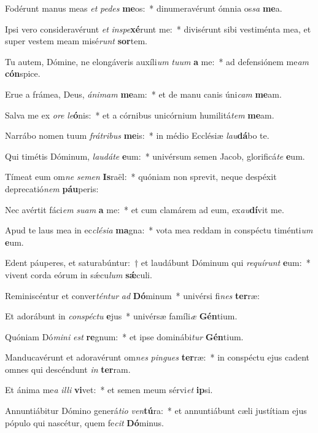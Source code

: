 \item Fodérunt manus meas \textit{et} \textit{pe}\textit{des} \textbf{me}os:~* dinumeravérunt ómnia os\textit{sa} \textbf{me}a.
\item Ipsi vero consideravérunt \textit{et} \textit{in}\textit{spe}\textbf{xé}runt me:~* divisérunt sibi vestiménta mea, et super vestem meam misé\textit{runt} \textbf{sor}tem.
\item Tu autem, Dómine, ne elongáveris auxíli\textit{um} \textit{tu}\textit{um} \textbf{a} me:~* ad defensiónem me\textit{am} \textbf{cón}spice.
\item Erue a frámea, Deus, \textit{á}\textit{ni}\textit{mam} \textbf{me}am:~* et de manu canis úni\textit{cam} \textbf{me}am.
\item Salva me ex \textit{o}\textit{re} \textit{le}\textbf{ó}nis:~* et a córnibus unicórnium humilitá\textit{tem} \textbf{me}am.
\item Narrábo nomen tuum \textit{frá}\textit{tri}\textit{bus} \textbf{me}is:~* in médio Ecclésiæ \textit{lau}\textbf{dá}bo te.
\item Qui timétis Dóminum, \textit{lau}\textit{dá}\textit{te} \textbf{e}um:~* univérsum semen Jacob, glorificá\textit{te} \textbf{e}um.
\item Tímeat eum om\textit{ne} \textit{se}\textit{men} \textbf{Is}raël:~* quóniam non sprevit, neque despéxit deprecatió\textit{nem} \textbf{páu}peris:
\item Nec avértit fáci\textit{em} \textit{su}\textit{am} \textbf{a} me:~* et cum clamárem ad eum, ex\textit{au}\textbf{dí}vit me.
\item Apud te laus mea in ec\textit{clé}\textit{si}\textit{a} \textbf{ma}gna:~* vota mea reddam in conspéctu timénti\textit{um} \textbf{e}um.
\item Edent páuperes, et saturabúntur:~† et laudábunt Dóminum qui \textit{re}\textit{quí}\textit{runt} \textbf{e}um:~* vivent corda eórum in sǽcu\textit{lum} \textbf{sǽ}culi.
\item Reminiscéntur et conver\textit{tén}\textit{tur} \textit{ad} \textbf{Dó}minum~* univérsi fi\textit{nes} \textbf{ter}ræ:
\item Et adorábunt in \textit{con}\textit{spéc}\textit{tu} \textbf{e}jus~* univérsæ famíli\textit{æ} \textbf{Gén}tium.
\item Quóniam Dó\textit{mi}\textit{ni} \textit{est} \textbf{re}gnum:~* et ipse dominábi\textit{tur} \textbf{Gén}tium.
\item Manducavérunt et adoravérunt om\textit{nes} \textit{pin}\textit{gues} \textbf{ter}ræ:~* in conspéctu ejus cadent omnes qui descéndunt \textit{in} \textbf{ter}ram.
\item Et ánima me\textit{a} \textit{il}\textit{li} \textbf{vi}vet:~* et semen meum sérvi\textit{et} \textbf{ip}si.
\item Annuntiábitur Dómino generá\textit{ti}\textit{o} \textit{ven}\textbf{tú}ra:~* et annuntiábunt cæli justítiam ejus pópulo qui nascétur, quem fe\textit{cit} \textbf{Dó}minus.
